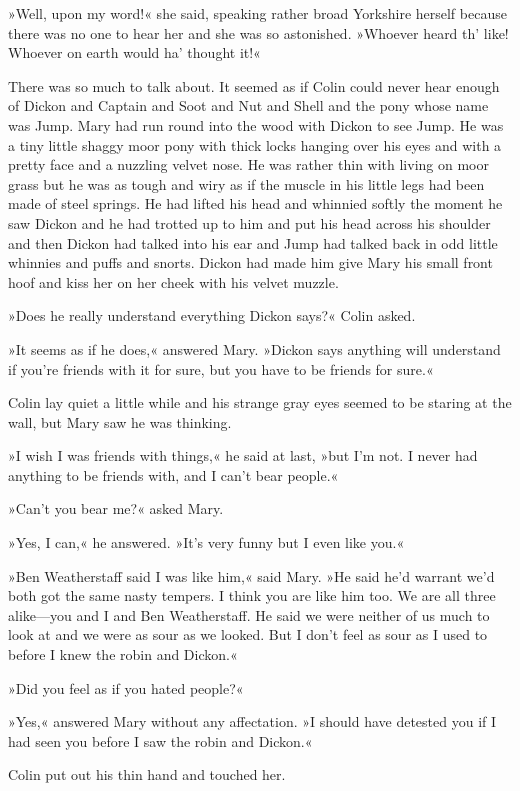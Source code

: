 »Well, upon my word!« she said, speaking rather broad Yorkshire herself because there was no one to hear her and she was so astonished. »Whoever heard th' like! Whoever on earth would ha' thought it!«

There was so much to talk about. It seemed as if Colin could never hear enough of Dickon and Captain and Soot and Nut and Shell and the pony whose name was Jump. Mary had run round into the wood with Dickon to see Jump. He was a tiny little shaggy moor pony with thick locks hanging over his eyes and with a pretty face and a nuzzling velvet nose. He was rather thin with living on moor grass but he was as tough and wiry as if the muscle in his little legs had been made of steel springs. He had lifted his head and whinnied softly the moment he saw Dickon and he had trotted up to him and put his head across his shoulder and then Dickon had talked into his ear and Jump had talked back in odd little whinnies and puffs and snorts. Dickon had made him give Mary his small front hoof and kiss her on her cheek with his velvet muzzle.

»Does he really understand everything Dickon says?« Colin asked.

»It seems as if he does,« answered Mary. »Dickon says anything will understand if you're friends with it for sure, but you have to be friends for sure.«

Colin lay quiet a little while and his strange gray eyes seemed to be staring at the wall, but Mary saw he was thinking.

»I wish I was friends with things,« he said at last, »but I'm not. I never had anything to be friends with, and I can't bear people.«

»Can't you bear me?« asked Mary.

»Yes, I can,« he answered. »It's very funny but I even like you.«

»Ben Weatherstaff said I was like him,« said Mary. »He said he'd warrant we'd both got the same nasty tempers. I think you are like him too. We are all three alike—you and I and Ben Weatherstaff. He said we were neither of us much to look at and we were as sour as we looked. But I don't feel as sour as I used to before I knew the robin and Dickon.«

»Did you feel as if you hated people?«

»Yes,« answered Mary without any affectation. »I should have detested you if I had seen you before I saw the robin and Dickon.«

Colin put out his thin hand and touched her.

